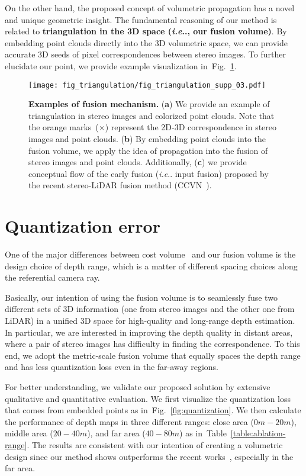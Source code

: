 \documentclass[letterpaper, 10 pt, conference]{ieeeconf}
\makeatletter
\DeclareRobustCommand\onedot{\futurelet\@let@token\@onedot}
\def\@onedot{\ifx\@let@token.\else.\null\fi\xspace}
\def\ie{\emph{i.e}\onedot} \def\Ie{{I.e}\onedot}
\newcommand{\Tref}[1]{Table~\textcolor{blue}{\ref{#1}}}
\newcommand{\Fref}[1]{Fig.~\textcolor{blue}{\ref{#1}}}
\makeatother
\begin{document}
On the other hand, the proposed concept of volumetric propagation has a novel and unique geometric insight. The fundamental reasoning of our method is related to \textbf{triangulation in the 3D space (\ie, our fusion volume)}. By embedding point clouds directly into the 3D volumetric space, we can provide accurate 3D seeds of pixel correspondences between stereo images. 
To further elucidate our point, we provide example visualization in~\Fref{fig:triangulation}.
\begin{figure}[!t]
\centering
\texttt{[image: fig\_triangulation/fig\_triangulation\_supp\_03.pdf]}
\caption{\textbf{Examples of fusion mechanism.}
(\textbf{a}) We provide an example of triangulation in stereo images and colorized point clouds. Note that the orange marks~($\boldsymbol{\times}$) represent the 2D-3D correspondence in stereo images and point clouds. 
(\textbf{b}) By embedding point clouds into the fusion volume, we apply the idea of propagation into the fusion of stereo images and point clouds. 
Additionally, (\textbf{c}) we provide conceptual flow of the early fusion (\ie input fusion) proposed by the recent stereo-LiDAR fusion method (CCVN~\cite{stereolidar_norm_costV_ccvn}). 
}
\vspace{-2mm}
\label{fig:triangulation}
\end{figure}



\section{Quantization error}
\label{supp-sec:Quantization error}
One of the major differences between cost volume~\cite{psmnet,gcnet,ganet} and our fusion volume is the design choice of depth range, which is a matter of different spacing choices along the referential camera ray.

Basically, our intention of using the fusion volume is to seamlessly fuse two different sets of  3D information (one from stereo images and the other one from LiDAR) in a unified 3D space for high-quality and long-range depth estimation. 
In particular, we are interested in improving the depth quality in distant areas, where a pair of stereo images has difficulty in finding the correspondence. To this end, we adopt the metric-scale fusion volume that equally spaces the depth range and has less quantization loss even in the far-away regions.

For better understanding, we validate our proposed solution by extensive qualitative and quantitative evaluation. We first visualize the quantization loss that comes from embedded points as in~\Fref{fig:quantization}. We then calculate the performance of depth maps in three different ranges: close area ($0m-20m$), middle area ($20-40m$), and far area ($40-80m$) as in~\Tref{table:ablation-range}. The results are consistent with our intention of creating a volumetric design since our method shows outperforms the recent works~\cite{stereolidar_00,stereolidar_01,stereolidar_norm_costV_ccvn}, especially in the far area. 
\end{document}
